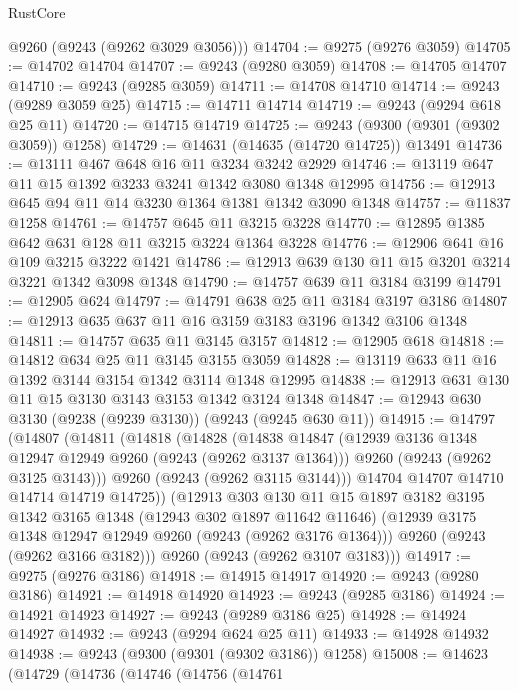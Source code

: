 \begin{lexlean}{RustCore}
\begin{coremodule}
      @9260
      (@9243 (@9262 @3029 @3056)))
@14704 := @9275 (@9276 @3059)
@14705 := @14702 @14704
@14707 := @9243 (@9280 @3059)
@14708 := @14705 @14707
@14710 := @9243 (@9285 @3059)
@14711 := @14708 @14710
@14714 := @9243 (@9289 @3059 @25)
@14715 := @14711 @14714
@14719 := @9243 (@9294 @618 @25 @11)
@14720 := @14715 @14719
@14725 := @9243 (@9300 (@9301 (@9302 @3059)) @1258)
@14729 := @14631 (@14635 (@14720 @14725)) @13491
@14736 := @13111 @467 @648 @16 @11 @3234 @3242 @2929
@14746 := @13119 @647 @11 @15 @1392 @3233 @3241 @1342 @3080 @1348 @12995
@14756 := @12913 @645 @94 @11 @14 @3230 @1364 @1381 @1342 @3090 @1348
@14757 := @11837 @1258
@14761 := @14757 @645 @11 @3215 @3228
@14770 := @12895 @1385 @642 @631 @128 @11 @3215 @3224 @1364 @3228
@14776 := @12906 @641 @16 @109 @3215 @3222 @1421
@14786 := @12913 @639 @130 @11 @15 @3201 @3214 @3221 @1342 @3098 @1348
@14790 := @14757 @639 @11 @3184 @3199
@14791 := @12905 @624
@14797 := @14791 @638 @25 @11 @3184 @3197 @3186
@14807 := @12913 @635 @637 @11 @16 @3159 @3183 @3196 @1342 @3106 @1348
@14811 := @14757 @635 @11 @3145 @3157
@14812 := @12905 @618
@14818 := @14812 @634 @25 @11 @3145 @3155 @3059
@14828 := @13119 @633 @11 @16 @1392 @3144 @3154 @1342 @3114 @1348 @12995
@14838 := @12913 @631 @130 @11 @15 @3130 @3143 @3153 @1342 @3124 @1348
@14847 := @12943 @630 @3130 (@9238 (@9239 @3130)) (@9243 (@9245 @630 @11))
@14915 := @14797
    (@14807
      (@14811
        (@14818
          (@14828
            (@14838
              @14847
              (@12939 @3136 @1348 @12947 @12949 @9260 (@9243 (@9262 @3137 @1364)))
              @9260
              (@9243 (@9262 @3125 @3143)))
            @9260
            (@9243 (@9262 @3115 @3144)))
          @14704
          @14707
          @14710
          @14714
          @14719
          @14725))
      (@12913
        @303
        @130
        @11
        @15
        @1897
        @3182
        @3195
        @1342
        @3165
        @1348
        (@12943 @302 @1897 @11642 @11646)
        (@12939 @3175 @1348 @12947 @12949 @9260 (@9243 (@9262 @3176 @1364)))
        @9260
        (@9243 (@9262 @3166 @3182)))
      @9260
      (@9243 (@9262 @3107 @3183)))
@14917 := @9275 (@9276 @3186)
@14918 := @14915 @14917
@14920 := @9243 (@9280 @3186)
@14921 := @14918 @14920
@14923 := @9243 (@9285 @3186)
@14924 := @14921 @14923
@14927 := @9243 (@9289 @3186 @25)
@14928 := @14924 @14927
@14932 := @9243 (@9294 @624 @25 @11)
@14933 := @14928 @14932
@14938 := @9243 (@9300 (@9301 (@9302 @3186)) @1258)
@15008 := @14623
    (@14729
      (@14736
        (@14746
          (@14756
            (@14761

\end{coremodule}
\end{lexlean}
